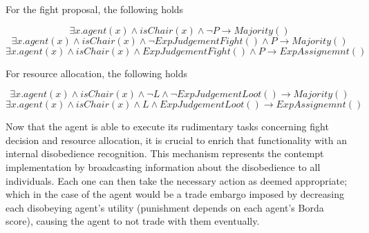 For the fight proposal, the following holds

\begin{equation}
    \exists x. agent(x) \land isChair(x) \land \neg P \rightarrow Majority()
\end{equation}
\begin{equation}
    \exists x. agent(x) \land isChair(x) \land \neg ExpJudgementFight() \land P \rightarrow Majority()
\end{equation}
\begin{equation}
    \exists x. agent(x) \land isChair(x) \land ExpJudgementFight() \land P \rightarrow ExpAssignemnt()
\end{equation}

For resource allocation, the following holds

\begin{equation}
    \exists x. agent(x) \land isChair(x) \land \neg L \land \neg ExpJudgementLoot()\rightarrow Majority()
\end{equation}
\begin{equation}
    \exists x. agent(x) \land isChair(x) \land L \land ExpJudgementLoot() \rightarrow ExpAssignemnt()
\end{equation}

Now that the agent is able to execute its rudimentary tasks concerning fight decision and resource allocation, it is crucial to enrich that functionality with an internal disobedience recognition. This mechanism represents the contempt implementation by broadcasting information about the disobedience to all individuals. Each one can then take the necessary action as deemed appropriate; which in the case of the agent would be a trade embargo imposed by decreasing each disobeying agent's utility (punishment depends on each agent's Borda score), causing the agent to not trade with them eventually.



